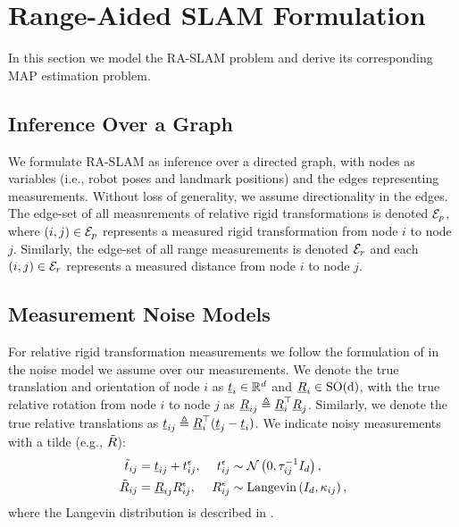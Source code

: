 \section{Range-Aided SLAM Formulation}

In this section we model the RA-SLAM problem and derive its
corresponding MAP estimation problem.

\subsection{Inference Over a Graph}

We formulate RA-SLAM as inference over a directed graph, with nodes as variables
(i.e., robot poses and landmark positions) and the edges representing
measurements. Without loss of generality, we assume directionality in the edges.
The edge-set of all measurements of relative rigid transformations is denoted
$\mathcal{E}_{p}$, where $(i,j) \in \mathcal{E}_{p}$ represents a measured
rigid transformation from node $i$ to node $j$. Similarly, the edge-set of all
range measurements is denoted $\mathcal{E}_{r}$ and each $(i,j) \in \mathcal{E}_{r}$
represents a measured distance from node $i$ to node $j$.

\subsection{Measurement Noise Models}
\label{sec:noise-models}

For relative rigid transformation measurements we follow the formulation of
\cite{rosen19ijrr} in the noise model we assume over our
measurements. We denote the true translation and orientation of node $i$ as
$\underline{t}_i \in \mathbb{R}^d$ and $\underline{R}_i \in \operatorname{{\operatorname{SO}}(d)}$, with the true relative rotation from node $i$ to node
$j$ as $\underline{R}_{ij} \triangleq \underline{R}_{i}^\top \underline{R}_{j}$. Similarly, we denote
the true relative translations as $\underline{t}_{ij} \triangleq \underline{R}_{i}^\top (
        \underline{t}_{j} - \underline{t}_{i} )$. We indicate noisy measurements with a tilde (e.g.,
$\tilde{R}$):
\begin{equation}
    \begin{aligned}
        \tilde{t}_{i j} & =\underline{t}_{i j}+{t}^{\epsilon}_{i j}, & {t}^{\epsilon}_{i j} & \sim \mathcal{N}\left(0, \tau_{i j}^{-1} I_{d}\right), \\
        \tilde{R}_{i j}  & =\underline{R}_{i j} {R}^{\epsilon}_{i j},   & {R}^{\epsilon}_{i j}  & \sim \operatorname{Langevin} \left(I_{d}, \kappa_{i j}\right),
    \end{aligned}
\end{equation}
where the Langevin distribution is described in \cite[App. A]{rosen19ijrr}.


